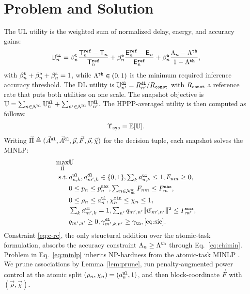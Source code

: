 \documentclass[journal]{IEEEtran}
\begin{document}
\section{Problem and Solution}
\label{sec:sol}
{The UL utility is the weighted sum of normalized delay, energy, and accuracy gains:}
\begin{equation}
\mathbb{U}_n^{\tt ul}
=\beta_n^{\tt t}\frac{\mathsf{T}_n^{\tt ref}-\mathsf{T}_n}{\mathsf{T}_n^{\tt ref}}
+\beta_n^{\tt e}\frac{\mathsf{E}_n^{\tt ref}-\mathsf{E}_n}{\mathsf{E}_n^{\tt ref}}
+\beta_n^{\tt a}\frac{\Lambda_n-\Lambda^{\tt th}}{1-\Lambda^{\tt th}},
\label{eq:Uul}
\end{equation}
with $\beta_n^{\tt t}+\beta_n^{\tt e}+\beta_n^{\tt a}=1$, while {$\Lambda^{\tt th} \in (0, 1)$ is the minimum required inference accuracy threshold.}
The DL utility is $\mathbb{U}_{n'}^{\tt dl}=R_{n'}^{\tt dl}/R_{\tt const}$ with $R_{\tt const}$ a reference rate that puts both utilities on one scale. The snapshot objective is $\mathbb{U}=\sum_{n\in\mathcal{N}^{\tt ul}}\mathbb{U}_n^{\tt ul}+\sum_{n'\in\mathcal{N}^{\tt dl}}\mathbb{U}_{n'}^{\tt dl}$. The HPPP-averaged utility is then computed as follows:
\begin{equation}
\Upsilon_{\tt sys}
=\mathbb{E}[\mathbb{U}].
\label{eq:upsilon}
\end{equation}
Writing $\vec{\Pi}\triangleq(\vec{A}^{\tt ul},\vec{A}^{\tt dl},\vec{p},\vec{F},\vec{\rho},\vec{\chi})$ for the decision tuple, each snapshot solves the MINLP:
\begin{subequations}\label{eq:minlp}
\begin{align}
\max_{\vec{\Pi}}&\mathbb{U}\\
\mathrm{s.t.}\,&a_{n,k}^{\tt ul},a_{m',k}^{\tt dl}\in\{0,1\},\textstyle\sum_k a_{n,k}^{\tt ul}\le1,F_{nm}\ge0,\label{eq:c-a}\\
&0\le p_n\le p_n^{\tt max},\textstyle\sum_{n\in\mathcal{N}_m^{\tt ul}}F_{nm}\le F_m^{\tt max},\label{eq:c-pf}\\
&0\le\rho_n\le a_n^{\tt ul},\chi_n^{\tt min}\le\chi_n\le1,\label{eq:c-rc}\\
&\textstyle\sum_k a_{m',k}^{\tt dl}=1,\textstyle\sum_{n'}q_{m',n'}\Vert\vec{w}_{m',n'}\Vert^2\le P_{m'}^{\tt max},\label{eq:c-dl}\\
&{q_{m',n'} \ge 0}, \gamma_{m',k,n'}^{\tt dl}\ge\gamma_{\tt th},\eqref{eq:sic}. \label{eq:c-sic}
\end{align}
\end{subequations}
Constraint \eqref{eq:c-rc}, the only structural addition over the atomic-task formulation, absorbs the accuracy constraint $\Lambda_n\ge\Lambda^{\tt th}$ through Eq.~\eqref{eq:chimin}. Problem in Eq.~\eqref{eq:minlp} inherits NP-hardness from the atomic-task MINLP \cite{Hoang_TCOM_2024}. We prune associations by Lemma~\ref{lem:prune}, run penalty-augmented power control at the atomic split $(\rho_n,\chi_n)=(a_n^{\tt ul},1)$, and then block-coordinate $\vec{F}$ with $(\vec{\rho},\vec{\chi})$.
\end{document}
